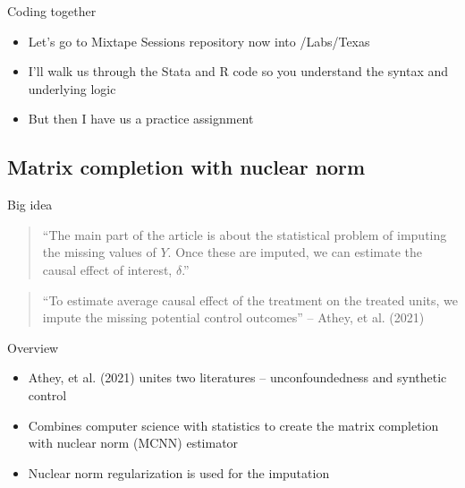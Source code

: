 \documentclass{beamer}
\begin{document}
\begin{frame}{Coding together}

\begin{itemize}
\item Let's go to Mixtape Sessions repository now into /Labs/Texas 
\item I'll walk us through the Stata and R code so you understand the syntax and underlying logic
\item But then I have us a practice assignment 
\end{itemize}

\end{frame}




\subsection{Matrix completion with nuclear norm}

\begin{frame}{Big idea}

\begin{quote}
``The main part of the article is about the statistical problem of imputing the missing values of $Y$.  Once these are imputed, we can estimate the causal effect of interest, $\delta$.''
\end{quote}

\bigskip

\begin{quote}
``To estimate average causal effect of the treatment on the treated units, we impute the missing potential control outcomes'' -- Athey, et al. (2021)
\end{quote}


\end{frame}

\begin{frame}{Overview}

\begin{itemize}
\item Athey, et al. (2021) unites two literatures -- unconfoundedness and synthetic control
\item Combines computer science with statistics to create the matrix completion with nuclear norm (MCNN) estimator
\item Nuclear norm regularization is used for the imputation
\end{itemize}

\end{frame}
\end{document}
